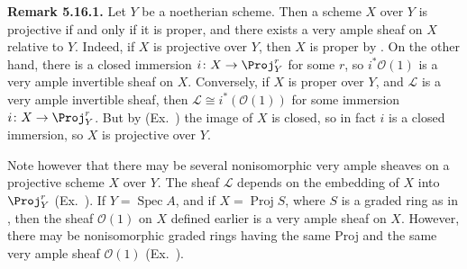 {\medskip
\noindent\hypertarget{result-II-5.16.1}{}\textbf{Remark 5.16.1.} Let $Y$ be a noetherian scheme. Then a scheme $X$ over $Y$ is projective if and only if it is proper, and there exists a very ample sheaf on $X$ relative to $Y$. Indeed, if $X$ is projective over $Y$, then $X$ is proper by . On the other hand, there is a closed immersion $i\colon X\to\Proj_Y^r$ for some $r$, so $i^*\mathcal O(1)$ is a very ample invertible sheaf on $X$. Conversely, if $X$ is proper over $Y$, and $\mathcal L$ is a very ample invertible sheaf, then $\mathcal L\cong i^*(\mathcal O(1))$ for some immersion $i\colon X\to\Proj_Y^r$. But by (Ex.~) the image of $X$ is closed, so in fact $i$ is a closed immersion, so $X$ is projective over $Y$.

Note however that there may be several nonisomorphic very ample sheaves on a projective scheme $X$ over $Y$. The sheaf $\mathcal L$ depends on the embedding of $X$ into $\Proj_Y^r$ (Ex.~). If $Y=\operatorname{Spec}A$, and if $X=\operatorname{Proj}S$, where $S$ is a graded ring as in , then the sheaf $\mathcal O(1)$ on $X$ defined earlier is a very ample sheaf on $X$. However, there may be nonisomorphic graded rings having the same Proj and the same very ample sheaf $\mathcal O(1)$ (Ex.~).
}
